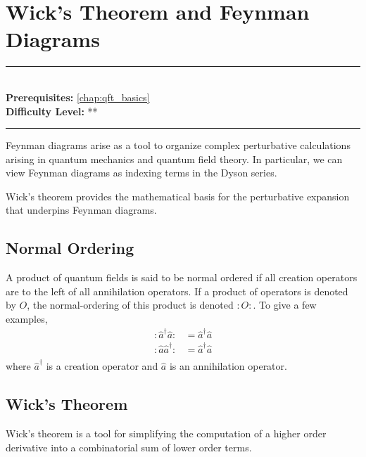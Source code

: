 \documentclass[book.tex]{subfiles}
\begin{document}
\chapter{Wick's Theorem and Feynman Diagrams}

\label{chap:feynman_diagrams_more}
\noindent\rule{11cm}{0.4pt} \\
\textbf{Prerequisites:} \autoref{chap:qft_basics}  \\
\textbf{Difficulty Level:} ** \\
\noindent\rule{11cm}{0.4pt}
\vspace{5mm}


Feynman diagrams arise as a tool to organize complex perturbative calculations arising in quantum mechanics and quantum field theory. In particular, we can view Feynman diagrams as indexing terms in the Dyson series.

Wick's theorem provides the mathematical basis for the perturbative expansion that underpins Feynman diagrams.

\section{Normal Ordering}

A product of quantum fields is said to be normal ordered if all creation operators are to the left of all annihilation operators. If a product of operators is denoted by $O$, the normal-ordering of this product is denoted $:O:$. To give a few examples,
\begin{align}
    :\hat{a}^\dagger \hat{a}: &= \hat{a}^\dagger \hat{a}\\
    :\hat{a} \hat{a}^\dagger: &= \hat{a}^\dagger \hat{a}\\    
\end{align}
where $\hat{a}^\dagger$ is a creation operator and $\hat{a}$ is an annihilation operator.
\section{Wick's Theorem}

Wick's theorem is a tool for simplifying the computation of a higher order derivative into a combinatorial sum of lower order terms.

\end{document}
